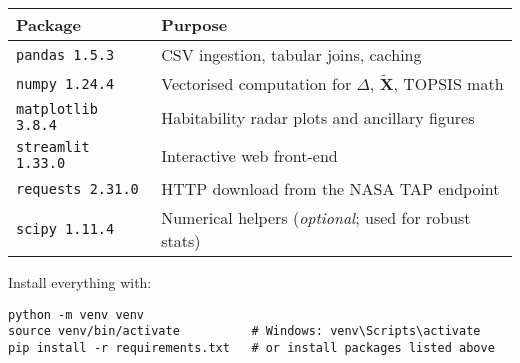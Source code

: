 \documentclass[12pt]{article}
\begin{document}
\begin{center}
\begin{tabular}{@{}ll@{}}
\toprule
\textbf{Package} & \textbf{Purpose} \\
\midrule
\texttt{pandas\,1.5.3}      & CSV ingestion, tabular joins, caching            \\
\texttt{numpy\,1.24.4}      & Vectorised computation for $\Delta$, $\tilde{\mathbf{X}}$, TOPSIS math \\
\texttt{matplotlib\,3.8.4}  & Habitability radar plots and ancillary figures   \\
\texttt{streamlit\,1.33.0}  & Interactive web front-end                       \\
\texttt{requests\,2.31.0}   & HTTP download from the NASA TAP endpoint         \\
\texttt{scipy\,1.11.4}      & Numerical helpers (\textit{optional}; used for robust stats) \\
\bottomrule
\end{tabular}
\end{center}

\noindent
Install everything with:

\begin{verbatim}
python -m venv venv
source venv/bin/activate          # Windows: venv\Scripts\activate
pip install -r requirements.txt   # or install packages listed above
\end{verbatim}
\end{document}
